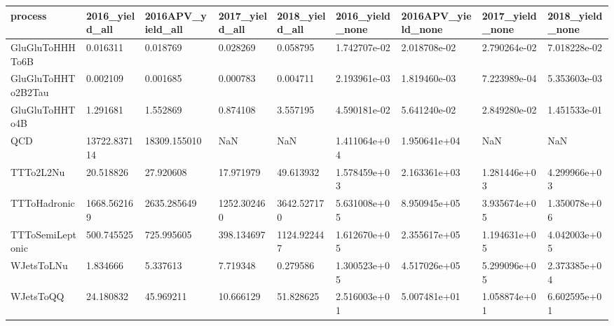 \begin{tabular}{lllllllll}
\toprule
           process & 2016\_yield\_all & 2016APV\_yield\_all & 2017\_yield\_all & 2018\_yield\_all & 2016\_yield\_none & 2016APV\_yield\_none & 2017\_yield\_none & 2018\_yield\_none \\
\midrule
   GluGluToHHHTo6B &       0.016311 &          0.018769 &       0.028269 &       0.058795 &    1.742707e-02 &       2.018708e-02 &    2.790264e-02 &    7.018228e-02 \\
GluGluToHHTo2B2Tau &       0.002109 &          0.001685 &       0.000783 &       0.004711 &    2.193961e-03 &       1.819460e-03 &    7.223989e-04 &    5.353603e-03 \\
    GluGluToHHTo4B &       1.291681 &          1.552869 &       0.874108 &       3.557195 &    4.590181e-02 &       5.641240e-02 &    2.849280e-02 &    1.451533e-01 \\
               QCD &   13722.837114 &      18309.155010 &            NaN &            NaN &    1.411064e+04 &       1.950641e+04 &             NaN &             NaN \\
         TTTo2L2Nu &      20.518826 &         27.920608 &      17.971979 &      49.613932 &    1.578459e+03 &       2.163361e+03 &    1.281446e+03 &    4.299966e+03 \\
      TTToHadronic &    1668.562169 &       2635.285649 &    1252.302460 &    3642.527170 &    5.631008e+05 &       8.950945e+05 &    3.935674e+05 &    1.350078e+06 \\
  TTToSemiLeptonic &     500.745525 &        725.995605 &     398.134697 &    1124.922447 &    1.612670e+05 &       2.355617e+05 &    1.194631e+05 &    4.042003e+05 \\
        WJetsToLNu &       1.834666 &          5.337613 &       7.719348 &       0.279586 &    1.300523e+05 &       4.517026e+05 &    5.299096e+05 &    2.373385e+04 \\
         WJetsToQQ &      24.180832 &         45.969211 &      10.666129 &      51.828625 &    2.516003e+01 &       5.007481e+01 &    1.058874e+01 &    6.602595e+01 \\
\bottomrule
\end{tabular}
